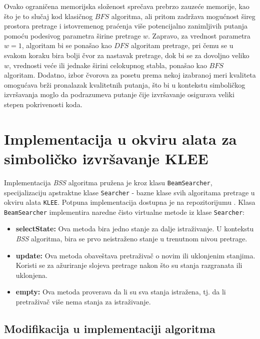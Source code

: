 \documentclass[a4paper]{article}
\begin{document}
Ovako ograničena memorijska složenost sprečava prebrzo zauzeće memorije, kao što je to slučaj kod klasičnog $BFS$ algoritma, ali pritom zadržava mogućnost šireg prostora pretrage i istovremenog praćenja više potencijalno zanimljivih putanja pomoću podesivog parametra širine pretrage $w$. Zapravo, za vrednost parametra $w = 1$, algoritam bi se ponašao kao $DFS$ algoritam pretrage, pri čemu se u svakom koraku bira bolji čvor za nastavak pretrage, dok bi se za dovoljno veliko $w$, vrednosti veće ili jednake širini celokupnog stabla, ponašao kao $BFS$ algoritam. Dodatno, izbor čvorova za posetu prema nekoj izabranoj meri kvaliteta omogućava brži pronalazak kvalitetnih putanja, što bi u kontekstu simboličkog izvršavanja moglo da podrazumeva putanje čije izvršavanje osigurava veliki stepen pokrivenosti koda.

\section{Implementacija u okviru alata za simboličko izvršavanje KLEE}

Implementacija \textit{BSS} algoritma pružena je kroz klasu \verb|BeamSearcher|, specijalizaciju apstraktne klase \verb|Searcher| - bazne klase svih algoritama pretrage u okviru alata \verb|KLEE|. Potpuna implementacija dostupna je na repozitorijumu \cite{Projekat}. Klasa \verb|BeamSearcher| implementira naredne čisto virtualne metode iz klase \verb|Searcher|:

\begin{itemize}
    \item \textbf{selectState:} Ova metoda bira jedno stanje za dalje istraživanje. U kontekstu \textit{BSS} algoritma, bira se prvo neistraženo stanje u trenutnom nivou pretrage.

    \item \textbf{update:} Ova metoda obaveštava pretraživač o novim ili uklonjenim stanjima. Koristi se za ažuriranje slojeva pretrage nakon što su stanja razgranata ili uklonjena.

    \item \textbf{empty:} Ova metoda proverava da li su sva stanja istražena, tj. da li pretraživač više nema stanja za istraživanje.
\end{itemize}

\subsection{Modifikacija u implementaciji algoritma}
\end{document}
